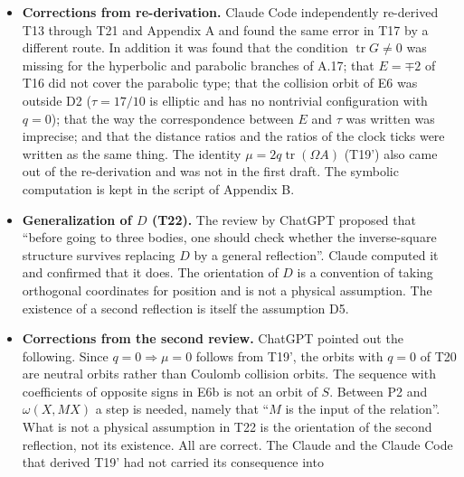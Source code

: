 \documentclass[
  a4paper,
]{article}
\begin{document}
\begin{itemize}
  clock ran idle on orbits with \(q=0\); a counting of degrees of
  freedom was used as a proof of indistinguishability; \(\tau<-2\) was
  not treated; and it was asserted outright that three dimensions
  require four values. These were found in the review by ChatGPT. Both
  the Claude that wrote the draft and the Claude Code that re-derived
  the results had missed them. As with the first thought experiment,
  they were not found by verification of the same lineage but by review
  of a different lineage.
\item
  \textbf{Corrections from re-derivation.} Claude Code independently
  re-derived T13 through T21 and Appendix A and found the same error in
  T17 by a different route. In addition it was found that the condition
  \(\operatorname{tr}G\neq0\) was missing for the hyperbolic and
  parabolic branches of A.17; that \(E=\mp2\) of T16 did not cover the
  parabolic type; that the collision orbit of E6 was outside D2
  (\(\tau=17/10\) is elliptic and has no nontrivial configuration with
  \(q=0\)); that the way the correspondence between \(E\) and \(\tau\)
  was written was imprecise; and that the distance ratios and the ratios
  of the clock ticks were written as the same thing. The identity
  \(\mu=2q\operatorname{tr}(\Omega A)\) (T19') also came out of the
  re-derivation and was not in the first draft. The symbolic computation
  is kept in the script of Appendix B.
\item
  \textbf{Generalization of \(D\) (T22).} The review by ChatGPT proposed
  that ``before going to three bodies, one should check whether the
  inverse-square structure survives replacing \(D\) by a general
  reflection''. Claude computed it and confirmed that it does. The
  orientation of \(D\) is a convention of taking orthogonal coordinates
  for position and is not a physical assumption. The existence of a
  second reflection is itself the assumption D5.
\item
  \textbf{Corrections from the second review.} ChatGPT pointed out the
  following. Since \(q=0\Rightarrow\mu=0\) follows from T19', the orbits
  with \(q=0\) of T20 are neutral orbits rather than Coulomb collision
  orbits. The sequence with coefficients of opposite signs in E6b is not
  an orbit of \(S\). Between P2 and \(\omega(X,MX)\) a step is needed,
  namely that ``\(M\) is the input of the relation''. What is not a
  physical assumption in T22 is the orientation of the second
  reflection, not its existence. All are correct. The Claude and the
  Claude Code that derived T19' had not carried its consequence into

\end{itemize}
\end{document}

